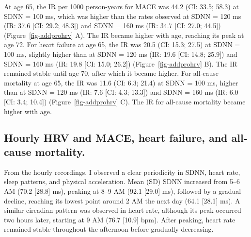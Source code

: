 \documentclass[
  a4paper,
  headsepline=true,
  open=any]{scrbook}
\begin{document}
At age 65, the IR per 1000 person-years for MACE was 44.2 (CI: 33.5;
58.3) at SDNN = 100 ms, which was higher than the rates observed at SDNN
= 120 ms (IR: 37.6 {[}CI: 29.2; 48.3{]}) and SDNN = 160 ms (IR: 34.7
{[}CI: 27.0; 44.5{]}) (Figure~\ref{fig-addprohrv} A). The IR became
higher with age, reaching its peak at age 72. For heart failure at age
65, the IR was 20.5 (CI: 15.3; 27.5) at SDNN = 100 ms, slightly higher
than at SDNN = 120 ms (IR: 19.6 {[}CI: 14.8; 25.9{]}) and SDNN = 160 ms
(IR: 19.8 {[}CI: 15.0; 26.2{]}) (Figure~\ref{fig-addprohrv} B). The IR
remained stable until age 70, after which it became higher. For
all-cause mortality at age 65, the IR was 11.6 (CI: 6.3; 21.4) at SDNN =
100 ms, higher than at SDNN = 120 ms (IR: 7.6 {[}CI: 4.3; 13.3{]}) and
SDNN = 160 ms (IR: 6.0 {[}CI: 3.4; 10.4{]}) (Figure~\ref{fig-addprohrv}
C). The IR for all-cause mortality became higher with age.

\hypertarget{hourly-hrv-and-mace-heart-failure-and-all-cause-mortality.}{%
\subsection{Hourly HRV and MACE, heart failure, and all-cause
mortality.}\label{hourly-hrv-and-mace-heart-failure-and-all-cause-mortality.}}

From the hourly recordings, I observed a clear periodicity in SDNN,
heart rate, sleep patterns, and physical acceleration. Mean (SD) SDNN
increased from 5--6 AM (70.2 {[}28.8{]} ms), peaking at 8--9 AM (92.1
{[}29.0{]} ms), followed by a gradual decline, reaching its lowest point
around 2 AM the next day (64.1 {[}28.1{]} ms). A similar circadian
pattern was observed in heart rate, although its peak occurred two hours
later, starting at 9 AM (76.7 {[}10.9{]} bpm). After peaking, heart rate
remained stable throughout the afternoon before gradually decreasing.
\end{document}
